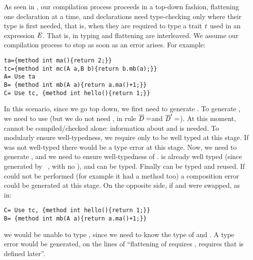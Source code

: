 As seen in , our compilation process
proceeds in a top-down fashion, flattening one declaration at a time,
and declarations need type-checking
only where their type is first needed,
that is, when they are required to type a trait $\mathit{t}$ used in an expression $\mathit{E}$.
That is, in \name typing and flattening are interleaved. We assume our compilation process to stop as soon as 
an error arises. 
For example:
\saveSpace\saveSpace\begin{lstlisting}
ta={method int ma(){return 2;}}
tc={method int mc(A a,B b){return b.mb(a);}}
A= Use ta
B= {method int mb(A a){return a.ma()+1;}}
C= Use tc, {method int hello(){return 1;}}
\end{lstlisting}\saveSpace\saveSpace
In this scenario, since we go top down, we first need to generate \Q@A@.
To generate \Q@A@, we need to use \Q@ta@ (but we do not need
\Q@tc@, in rule  $\overline{\mathit{D}}=$\Q@ta@ and $\overline{\mathit{D}}'=$\Q@tc@).
At this moment, \Q@tc@ cannot be compiled/checked alone:
information about \Q@A@ and \Q@B@ is needed.
To modularly ensure well-typedness,
we require only \Q@ta@ to be well typed at this stage. If \Q@ta@ was not well-typed
there would be a type error at this stage.
Now, we need to generate \Q@C@, and we need to ensure well-typedness of \Q@tc@.
\Q@A@ is already well typed (since generated by \use\ \Q@ta@, with no \mL),
and \Q@B@ can be typed. Finally \Q@tc@ can be typed and reused.
If  could not be performed (for example it \Q@tc@ had a method \Q@hello@ too)
a composition error could be generated at this stage.
On the opposite side, if \Q@B@ and \Q@C@ were swapped, as in:
\saveSpace\saveSpace\begin{lstlisting}
C= Use tc, {method int hello(){return 1;}}
B= {method int mb(A a){return a.ma()+1;}}
\end{lstlisting}\saveSpace\saveSpace
\noindent
we would be unable to type \Q@tc@, since we need to know the type of \Q@A@ and \Q@B@.
A type error would be generated, on the lines of ``flattening of \Q@C@
requires \Q@tc@, \Q@tc@ requires \Q@B@ that is defined later''.



